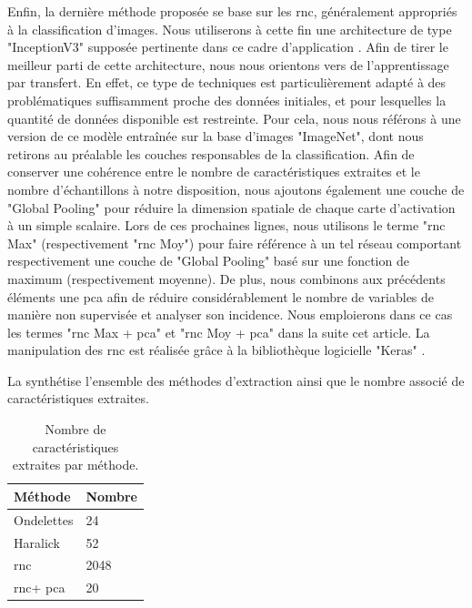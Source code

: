 \documentclass{gretsi}
\begin{document}
\begin{sloppypar}
Enfin, la dernière méthode proposée se base sur les \acs{rnc}, généralement appropriés à la classification d'images. Nous utiliserons à cette fin une architecture de type "InceptionV3" supposée pertinente dans ce cadre d'application \cite{Litjens2017}. Afin de tirer le meilleur parti de cette architecture, nous nous orientons vers de l'apprentissage par transfert. En effet, ce type de techniques est particulièrement adapté à des problématiques suffisamment proche des données initiales, et pour lesquelles la quantité de données disponible est restreinte. Pour cela, nous nous référons à une version de ce modèle entraînée sur la base d'images "ImageNet", dont nous retirons au préalable les couches responsables de la classification. Afin de conserver une cohérence entre le nombre de caractéristiques extraites et le nombre d'échantillons à notre disposition, nous ajoutons également une couche de "Global Pooling" pour réduire la dimension spatiale de chaque carte d'activation à un simple scalaire. Lors de ces prochaines lignes, nous utilisons le terme "\ac{rnc} Max" (respectivement "\ac{rnc} Moy") pour faire référence à un tel réseau comportant respectivement une couche de "Global Pooling" basé sur une fonction de maximum (respectivement moyenne). De plus, nous combinons aux précédents éléments une \ac{pca} afin de réduire considérablement le nombre de variables de manière non supervisée et analyser son incidence. Nous emploierons dans ce cas les termes "\ac{rnc} Max + \ac{pca}" et "\ac{rnc} Moy + \ac{pca}" dans la suite cet article. La manipulation des \ac{rnc} est réalisée grâce à la bibliothèque logicielle "Keras" \cite{chollet2015keras}.\par
La  synthétise l'ensemble des méthodes d'extraction ainsi que le nombre associé de caractéristiques extraites.
\begin{table}[h]
\centering
    \begin{tabular*}{0.6\linewidth}{l@{\extracolsep{\fill}}l}
        \hline
        \textbf{Méthode} & \textbf{Nombre} \\
        \hline
        Ondelettes & 24 \\
        \hline
        Haralick & 52\\
        \hline
        \ac{rnc} & 2048\\
        \hline
        \ac{rnc}+ \ac{pca} & 20\\
        \hline
    \end{tabular*}
    \caption{Nombre de caractéristiques extraites par méthode.}
    \label{variables}
\end{table}


\end{sloppypar}
\end{document}
